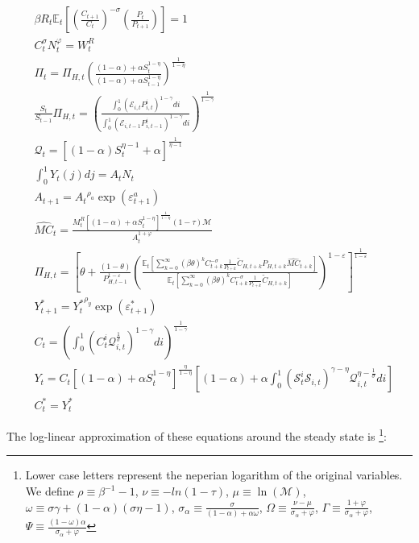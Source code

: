\documentclass{article}
\newcommand{\Et}{\mathbb{E}_t}
\newcommand{\E}{\mathcal{E}}
\begin{document}
\begin{subequations}
    \label{se}
    \begin{align}
        &\beta R_t \Et\left[\left(\frac{C_{t+1}}{C_t} \right)^{-\sigma} \left(\frac{P_t}{P_{t+1}} \right) \right] = 1\\
        & C_t^\sigma N_t^\varphi = W_t^R\\
        &\Pi_t = \Pi_{H,t} \left(\frac{(1-\alpha) + \alpha S_t^{1-\eta}} {(1-\alpha) + \alpha S_{t-1}^{1-\eta}} \right)^{\frac{1}{1-\eta}}\\
        &\frac{S_t}{S_{t-1}}\Pi_{H,t} = \left(\frac{\int^1_0 \left(\E_{i,t} P^i_{i,t} \right)^{1-\gamma} di }{\int^1_0 \left(\E_{i,t-1} P^i_{i,t-1} \right)^{1-\gamma} di} \right)^{\frac{1}{1-\gamma}}\\
        &\mathcal{Q}_{t}  = \left[(1-\alpha)S_t^{\eta-1} + \alpha \right]^{\frac{1}{\eta-1}}\\
        &\int^1_0 Y_t(j) dj = A_t N_t\\
        &A_{t+1} = {A_t}^{\rho_a}\exp( \varepsilon^a_{t+1})\\
        &\widehat{MC}_t  = \frac{M_t^R \left[(1-\alpha) + \alpha S_t^{1-\eta} \right]^{\frac{1}{1-\eta}} (1 - \tau) \mathcal M}{A_t^{1+\varphi}}\\
        &\Pi_{H,t} = \left[ \theta + \frac{(1-\theta)}{P_{H,t-1}^{1-\varepsilon}} \left(\frac{\Et\left[ \sum^\infty_{k=0} (\beta\theta)^k C_{t+k}^{-\sigma} \frac{1}{P_{t+k}}\tilde C_{H,t+k} P_{H,t+k} \widehat{MC}_{t+k}\right] }{\Et\left[ \sum^\infty_{k=0} (\beta\theta)^k C_{t+k}^{-\sigma} \frac{1}{P_{t+k}} \tilde C_{H,t+k}  \right]} \right)^{1-\varepsilon}\right]^\frac{1}{1-\varepsilon}\\
        &Y^*_{t+1} = {Y^*_t}^{\rho_y}\exp( \varepsilon^*_{t+1})\\
        &C_t = \left(\int^1_0  \left(C_t^i \mathcal Q_{i,t}^{\frac{1}{\sigma}}\right)^{1-\gamma} di \right)^{\frac{1}{1-\gamma}}\\
        &Y_{t} = C_t \left[(1-\alpha) + \alpha S_t^{1-\eta} \right]^{\frac{\eta}{1-\eta}} \left[(1-\alpha)  +  \alpha \int_0^1 \left(\mathcal S^i_t \mathcal S_{i,t} \right)^{\gamma - \eta} \mathcal Q^{\eta - \frac{1}{\sigma}}_{i,t} di \right] \\
        & C_t^* = Y_t^*
    \end{align}
\end{subequations}

The log-linear approximation of these equations around the steady state is \footnote{Lower case letters represent the neperian logarithm of the original variables. We define $\rho \equiv \beta^{-1} -1$,  $\nu \equiv -ln(1-\tau)$, $\mu \equiv \ln(\mathcal M)$, $\omega \equiv \sigma \gamma + (1-\alpha)(\sigma \eta - 1)$, $\sigma_\alpha \equiv \frac{\sigma}{(1-\alpha) + \alpha \omega}$, $\Omega \equiv \frac{\nu - \mu}{\sigma_\alpha + \varphi}$, $\Gamma \equiv \frac{1 + \varphi}{\sigma_\alpha + \varphi}$, $\Psi \equiv \frac{(1-\omega) \alpha}{\sigma_\alpha + \varphi}$}:
\end{document}

